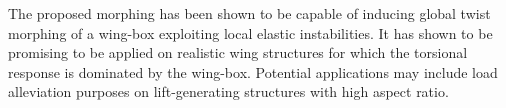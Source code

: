 The proposed morphing has been shown to be capable of inducing global twist morphing of a wing-box exploiting local elastic instabilities. It has shown to be promising to be applied on realistic wing structures for which the torsional response is dominated by the wing-box. Potential applications may include load alleviation purposes on lift-generating structures with high aspect ratio. 